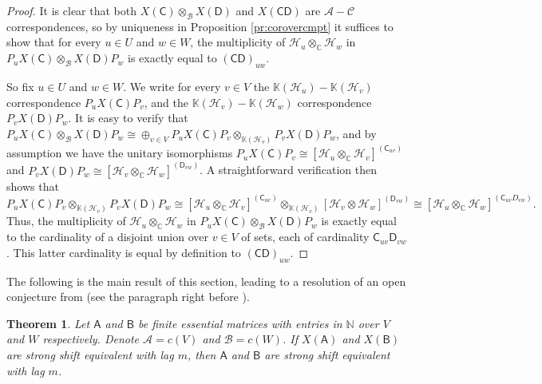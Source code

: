\documentclass[11pt, letterpaper,final]{amsart}
\newcommand{\A}{{\mathcal{A}}}
\newcommand{\B}{{\mathcal{B}}}
\newcommand{\C}{{\mathcal{C}}}
\renewcommand{\H}{{\mathcal{H}}}
\newcommand{\bbK}{{\mathbb{K}}}
\newtheorem{thm}{Theorem}[section]
\theoremstyle{definition}
\begin{document}
\begin{proof}
It is clear that both $X(\mathsf{C}) \otimes_\B X(\mathsf{D})$ and $X(\mathsf{C}\mathsf{D})$ are $\A-\C$ correspondences, so by uniqueness in Proposition \ref{pr:corovercmpt} it suffices to show that for every $u\in U$ and $w\in W$, the multiplicity of $\H_u\otimes_\mathbb{C} \H_w$ in $P_u X(\mathsf{C}) \otimes_\B X(\mathsf{D}) P_w$ is exactly equal to $(\mathsf{C}\mathsf{D})_{uw}$.

So fix $u\in U$ and $w\in W$. We write for every $v\in V$ the $\bbK(\H_u)-\bbK(\H_v)$ correspondence $P_u X(\mathsf{C}) P_v$, and the $\bbK(\H_v) - \bbK(\H_w)$ correspondence $P_v X(\mathsf{D}) P_w$. It is easy to verify that $P_u X(\mathsf{C}) \otimes_{\B} X(\mathsf{D}) P_w \cong \oplus_{v\in V} P_u X(\mathsf{C}) P_v \otimes_{\bbK(\H_v)} P_v X(\mathsf{D}) P_w$, and by assumption we have the unitary isomorphisms $P_u X(\mathsf{C}) P_v \cong [\H_u \otimes_\mathbb{C} \H_v]^{(\mathsf{C}_{uv})}$ and $P_v X(\mathsf{D}) P_w \cong [\H_v\otimes_\mathbb{C} \H_w]^{(\mathsf{D}_{vw})}$. A straightforward verification then shows that
$$
P_u X(\mathsf{C}) P_v \otimes_{\bbK(\H_v)} P_v X(\mathsf{D}) P_w \cong [\H_u \otimes_\mathbb{C} \H_v]^{(\mathsf{C}_{uv})} \otimes_{\bbK(\H_v)} [\H_v\otimes \H_w]^{(\mathsf{D}_{vw})} \cong [\H_u \otimes_\mathbb{C} \H_w]^{(\mathsf{C}_{uv}D_{vw})}.
$$
Thus, the multiplicity of $\H_u \otimes_\mathbb{C} \H_w$ in $P_u X(\mathsf{C}) \otimes_{\B} X(\mathsf{D}) P_w$ is exactly equal to the cardinality of a disjoint union over $v\in V$ of sets, each of cardinality $\mathsf{C}_{uv}\mathsf{D}_{vw}$. This latter cardinality is equal by definition to $(\mathsf{C}\mathsf{D})_{uw}$.
\end{proof}

The following is the main result of this section, leading to a resolution of an open conjecture from \cite[Section 6]{KK-JFA2014} (see the paragraph right before \cite[Theorem 6.1]{KK-JFA2014}).


\begin{thm}\label{thm-SSEmodule-implies-SSE}
Let $\mathsf{A}$ and $\mathsf{B}$ be finite essential matrices with entries in $\mathbb{N}$ over $V$ and $W$ respectively. Denote $\A = c(V)$ and $\B = c(W)$. If $X(\mathsf{A})$ and $X(\mathsf{B})$ are strong shift equivalent with lag $m$, then $\mathsf{A}$ and $\mathsf{B}$ are strong shift equivalent with lag $m$.
\end{thm}
\end{document}
